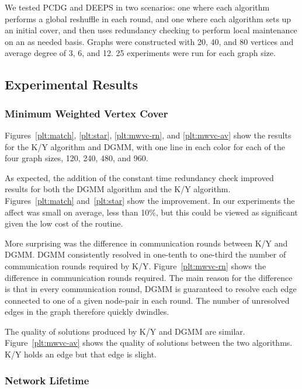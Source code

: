 \documentclass[conference, 10pt]{IEEEtran}
\begin{document}
We tested PCDG and DEEPS in two scenarios: one where each algorithm performs a global reshuffle in each round, and one where each algorithm sets up an initial cover, and then uses redundancy checking to perform local maintenance on an as needed basis. Graphs were constructed with 20, 40, and 80 vertices and average degree of 3, 6, and 12. 25 experiments were run for each graph size.
 
\subsection{Experimental Results}
\label{sub:exp-results}
\subsubsection{Minimum Weighted Vertex Cover}
\label{sub:mwvc-results}

Figures~\ref{plt:match}, \ref{plt:star}, \ref{plt:mwvc-rn}, and \ref{plt:mwvc-av} show the results for the K/Y algorithm and DGMM, with one line in each color for each of the four graph sizes, 120, 240, 480, and 960.

As expected, the addition of the constant time redundancy check improved results for both the DGMM algorithm and the K/Y algorithm. Figures~\ref{plt:match} and~\ref{plt:star} show the improvement. In our experiments the affect was small on average, less than 10\%, but this could be viewed as significant given the low cost of the routine. 


More surprising was the difference in communication rounds between K/Y and DGMM. DGMM consistently resolved in one-tenth to one-third the number of communication rounds required by K/Y. Figure~\ref{plt:mwvc-rn} shows the difference in communication rounds required. The main reason for the difference is that in every communication round, DGMM is guaranteed to resolve each edge connected to one of a given node-pair in each round. The number of unresolved edges in the graph therefore quickly dwindles.


The quality of solutions produced by K/Y and DGMM are similar. Figure~\ref{plt:mwvc-av} shows the quality of solutions between the two algorithms. K/Y holds an edge but that edge is slight.
  


\subsubsection{Network Lifetime}
\label{sub:netlife-results}
\end{document}
